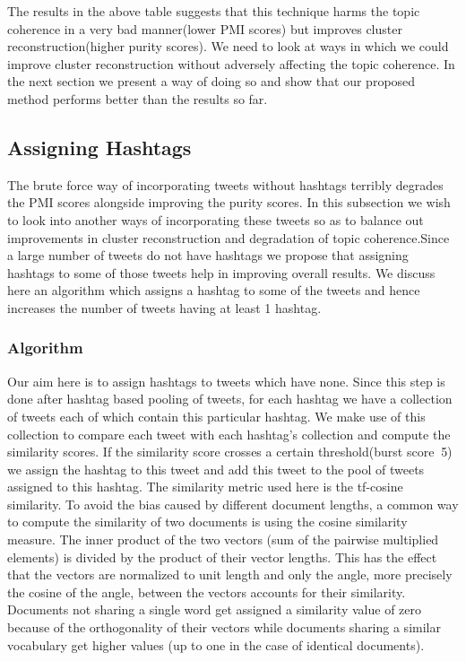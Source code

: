 \documentclass[10pt,a5paper,twoside]{article}
\begin{document}
The results in the above table suggests that this technique harms the topic coherence in a very bad manner(lower PMI scores) but improves cluster reconstruction(higher purity scores). We need to look at ways in which we could improve cluster reconstruction without adversely affecting the topic coherence. In the next section we present a way of doing so and show that our proposed method performs better than the results so far.

\subsection{Assigning Hashtags}
The brute force way of incorporating tweets without hashtags terribly degrades the PMI scores alongside improving the purity scores. In this subsection we wish to look into another ways of incorporating these tweets so as to balance out improvements in cluster reconstruction and degradation of topic coherence.Since a large number of tweets do not have hashtags we propose that assigning hashtags to some of those tweets help in improving overall results. We discuss here an algorithm which assigns a hashtag to some of the tweets and hence increases the number of tweets having at least 1 hashtag.


\subsubsection{Algorithm}
Our aim here is to assign hashtags to tweets which have none. Since this step is done after hashtag based pooling of tweets, for each hashtag we have a collection of tweets each of which contain this particular hashtag. We make use of this collection to compare each tweet with each hashtag's collection and compute the similarity scores. If the similarity score crosses a certain threshold(burst score $\>$5) we assign the hashtag to this tweet and add this tweet to the pool of tweets assigned to this hashtag. The similarity metric used here is the tf-cosine similarity. To avoid the bias caused by different document lengths, a common way to compute the similarity of two documents is using the cosine similarity measure. The inner product of the two vectors (sum of the pairwise multiplied elements) is divided by the product of their vector lengths. This has the effect that the vectors are normalized to unit length and only the angle, more precisely the cosine of the angle, between the vectors accounts for their similarity. Documents not sharing a single word get assigned a similarity value of zero because of the orthogonality of their vectors while documents sharing a similar vocabulary get higher values (up to one in the case of identical documents).
\end{document}
